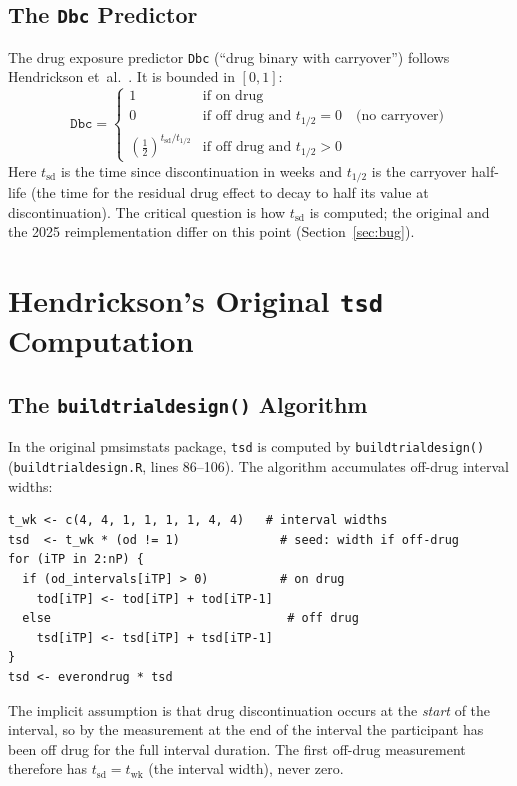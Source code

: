\documentclass[11pt]{article}
\begin{document}
\subsection{The \texttt{Dbc} Predictor}

The drug exposure predictor \texttt{Dbc} (``drug binary with
carryover'') follows Hendrickson et~al.\ \cite{hendrickson2020}. It
is bounded in $[0, 1]$:
\[
  \texttt{Dbc} =
  \begin{cases}
    1 & \text{if on drug} \\[4pt]
    0 & \text{if off drug and } t_{1/2} = 0
      \quad \text{(no carryover)} \\[4pt]
    \left(\tfrac{1}{2}\right)^{t_{\text{sd}} / t_{1/2}}
      & \text{if off drug and } t_{1/2} > 0
  \end{cases}
\]
Here $t_{\text{sd}}$ is the time since discontinuation in weeks and
$t_{1/2}$ is the carryover half-life (the time for the residual drug
effect to decay to half its value at discontinuation). The critical
question is how $t_{\text{sd}}$ is computed; the original and the 2025
reimplementation differ on this point (Section~\ref{sec:bug}).

\section{Hendrickson's Original \texttt{tsd} Computation}
\label{sec:original}

\subsection{The \texttt{buildtrialdesign()} Algorithm}

In the original pmsimstats package, \texttt{tsd} is computed by
\texttt{buildtrialdesign()} (\texttt{buildtrialdesign.R}, lines
86--106). The algorithm accumulates off-drug interval widths:

\begin{verbatim}
t_wk <- c(4, 4, 1, 1, 1, 1, 4, 4)   # interval widths
tsd  <- t_wk * (od != 1)              # seed: width if off-drug
for (iTP in 2:nP) {
  if (od_intervals[iTP] > 0)          # on drug
    tod[iTP] <- tod[iTP] + tod[iTP-1]
  else                                 # off drug
    tsd[iTP] <- tsd[iTP] + tsd[iTP-1]
}
tsd <- everondrug * tsd
\end{verbatim}

The implicit assumption is that drug discontinuation occurs at the
\emph{start} of the interval, so by the measurement at the end of the
interval the participant has been off drug for the full interval
duration. The first off-drug measurement therefore has
$t_{\text{sd}} = t_{\text{wk}}$ (the interval width), never zero.
\end{document}
